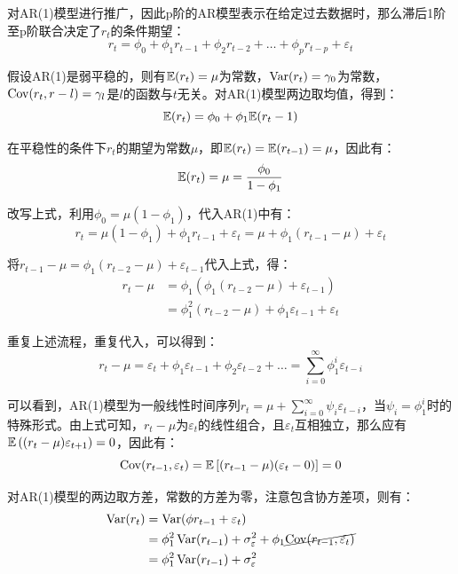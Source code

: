 \documentclass[11pt]{article}
\begin{document}
对AR(1)模型进行推广，因此p阶的AR模型表示在给定过去数据时，那么滞后1阶至p阶联合决定了$r_t$的条件期望：
\begin{equation*}
    r_t = \phi_0 + \phi_1 r_{t-1} +  \phi_2 r_{t-2} + \dots +  \phi_p r_{t-p}  + \varepsilon_t
\end{equation*}

假设AR(1)是弱平稳的，则有$\mathbb{E}(r_t)=\mu$为常数，$\operatorname{Var}(r_t)=\gamma_0$为常数，$\operatorname{Cov}(r_t,r-l) = \gamma_l$是$l$的函数与$t$无关。对AR(1)模型两边取均值，得到：
\begin{equation*}
    \mathbb{E}(r_t) = \phi_0 + \phi_1 \mathbb{E}(r_t-1)
\end{equation*}

在平稳性的条件下$r_t$的期望为常数$\mu$，即$\mathbb{E}(r_t) = \mathbb{E}(r_{t-1}) = \mu$，因此有：
\begin{equation*}
    \mathbb{E}(r_t) = \mu = \frac{\phi_0}{1-\phi_1}
\end{equation*}

改写上式，利用$\phi_0 = \mu(1-\phi_1)$，代入AR(1)中有：
\begin{equation*}
    r_t = \mu(1-\phi_1) + \phi_1 r_{t-1} + \varepsilon_t = \mu + \phi_1 (r_{t-1}-\mu)+ \varepsilon_t 
\end{equation*}

将$r_{t-1} - \mu = \phi_1 (r_{t-2}-\mu)+ \varepsilon_{t-1}$代入上式，得：
\begin{align*}
    r_t - \mu &= \phi_1 \left(\phi_1 (r_{t-2}-\mu)+ \varepsilon_{t-1} \right) \\
    &= \phi_1^2 (r_{t-2}-\mu)+ \phi_1 \varepsilon_{t-1} + \varepsilon_t
\end{align*}

重复上述流程，重复代入，可以得到：
\begin{equation*}
    r_t - \mu = \varepsilon_t + \phi_1 \varepsilon_{t-1} + \phi_2 \varepsilon_{t-2} + \dots = \sum_{i=0}^{\infty} \phi_{1}^{i} \varepsilon_{t-i}
\end{equation*}

可以看到，AR(1)模型为一般线性时间序列$r_t = \mu + \sum_{i=0}^{\infty} \psi_i \varepsilon_{t-i}$，当$\psi_i = \phi_{1}^{i}$时的特殊形式。由上式可知，$r_t-\mu$为$\varepsilon_t$的线性组合，且$\varepsilon_t$互相独立，那么应有$\mathbb{E}\left((r_{t}-\mu)\varepsilon_{t+1}\right)=0$，因此有：
\begin{equation*}
    \operatorname{Cov}(r_{t-1},\varepsilon_t) = \mathbb{E}\left[(r_{t-1} - \mu)(\varepsilon_{t} - 0) \right] = 0
\end{equation*}

对AR(1)模型的两边取方差，常数的方差为零，注意包含协方差项，则有：
\begin{align*}
    \operatorname{Var}(r_t) &= \operatorname{Var}(\phi r_{t-1} + \varepsilon_t) \\
    &= \phi_{1}^{2} \operatorname{Var}(r_{t-1}) + \sigma_{\varepsilon}^{2} + \phi_1 \cancel{\operatorname{Cov} (r_{t-1},\varepsilon_t)} \\
    &= \phi_{1}^{2} \operatorname{Var}(r_{t-1}) + \sigma_{\varepsilon}^{2}
\end{align*}
\end{document}
